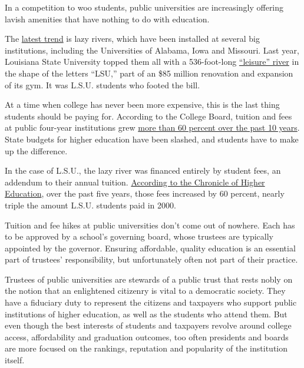 In a competition to woo students, public universities are increasingly
offering lavish amenities that have nothing to do with education.

The
\href{https://www.nytimes3xbfgragh.onion/2014/09/21/fashion/college-recreation-now-includes-pool-parties-and-river-rides.html}{latest
trend} is lazy rivers, which have been installed at several big
institutions, including the Universities of Alabama, Iowa and Missouri.
Last year, Louisiana State University topped them all with a
536-foot-long
\href{https://www.chronicle.com/article/The-Lure-of-the-Lazy-River/241434}{``leisure''
river} in the shape of the letters ``LSU,'' part of an \$85 million
renovation and expansion of its gym. It was L.S.U. students who footed
the bill.

At a time when college has never been more expensive, this is the last
thing students should be paying for. According to the College Board,
tuition and fees at public four-year institutions grew
\href{https://trends.collegeboard.org/college-pricing/figures-tables/published-prices-national}{more
than 60 percent over the past 10 years}. State budgets for higher
education have been slashed, and students have to make up the
difference.

In the case of L.S.U., the lazy river was financed entirely by student
fees, an addendum to their annual tuition.
\href{https://www.chronicle.com/article/The-Lure-of-the-Lazy-River/241434}{According
to the Chronicle of Higher Education}, over the past five years, those
fees increased by 60 percent, nearly triple the amount L.S.U. students
paid in 2000.

Tuition and fee hikes at public universities don't come out of nowhere.
Each has to be approved by a school's governing board, whose trustees
are typically appointed by the governor. Ensuring affordable, quality
education is an essential part of trustees' responsibility, but
unfortunately often not part of their practice.

Trustees of public universities are stewards of a public trust that
rests nobly on the notion that an enlightened citizenry is vital to a
democratic society. They have a fiduciary duty to represent the citizens
and taxpayers who support public institutions of higher education, as
well as the students who attend them. But even though the best interests
of students and taxpayers revolve around college access, affordability
and graduation outcomes, too often presidents and boards are more
focused on the rankings, reputation and popularity of the institution
itself.

